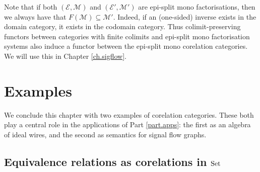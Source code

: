 \begin{example}
Note that if both $(\mathcal E, \mathcal M)$ and $(\mathcal E', \mathcal M')$
are epi-split mono factorisations, then we always have that $F(\mathcal M)
\subseteq \mathcal M'$. Indeed, if an (one-sided) inverse exists in the domain
category, it exists in the codomain category. Thus colimit-preserving functors
between categories with finite colimits and epi-split mono factorisation systems
also induce a functor between the epi-split mono corelation categories. We will
use this in Chapter \ref{ch.sigflow}.
\end{example}

\section{Examples} \label{sec.corelexs}
We conclude this chapter with two examples of corelation categories. These both
play a central role in the applications of Part \ref{part.apps}: the first as
an algebra of ideal wires, and the second as semantics for signal flow graphs.

\subsection{Equivalence relations as corelations in $\mathrm{Set}$}
\label{ssec.equivrels}
   
